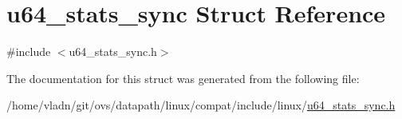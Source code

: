 \hypertarget{structu64__stats__sync}{}\section{u64\+\_\+stats\+\_\+sync Struct Reference}
\label{structu64__stats__sync}


{\ttfamily \#include $<$u64\+\_\+stats\+\_\+sync.\+h$>$}



The documentation for this struct was generated from the following file\+:\begin{DoxyCompactItemize}
\item 
/home/vladn/git/ovs/datapath/linux/compat/include/linux/\hyperlink{u64__stats__sync_8h}{u64\+\_\+stats\+\_\+sync.\+h}\end{DoxyCompactItemize}
